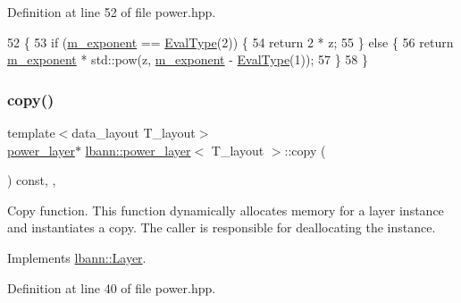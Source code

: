 Definition at line 52 of file power.\+hpp.


\begin{DoxyCode}
52                                                             \{
53     \textcolor{keywordflow}{if} (\hyperlink{classlbann_1_1power__layer_a778b995d25e24f5c82ab85cfeab2ee41}{m\_exponent} == \hyperlink{base_8hpp_a3266f5ac18504bbadea983c109566867}{EvalType}(2)) \{
54       \textcolor{keywordflow}{return} 2 * z;
55     \} \textcolor{keywordflow}{else} \{
56       \textcolor{keywordflow}{return} \hyperlink{classlbann_1_1power__layer_a778b995d25e24f5c82ab85cfeab2ee41}{m\_exponent} * std::pow(z, \hyperlink{classlbann_1_1power__layer_a778b995d25e24f5c82ab85cfeab2ee41}{m\_exponent} - \hyperlink{base_8hpp_a3266f5ac18504bbadea983c109566867}{EvalType}(1));
57     \}
58   \}
\end{DoxyCode}
\mbox{\label{classlbann_1_1power__layer_adb52a06aad68e2daee5ce2b738954bcb}} 
\subsubsection{\texorpdfstring{copy()}{copy()}}
{\footnotesize\ttfamily template$<$data\+\_\+layout T\+\_\+layout$>$ \\
\hyperlink{classlbann_1_1power__layer}{power\+\_\+layer}$\ast$ \hyperlink{classlbann_1_1power__layer}{lbann\+::power\+\_\+layer}$<$ T\+\_\+layout $>$\+::copy (\begin{DoxyParamCaption}{ }\end{DoxyParamCaption}) const\hspace{0.3cm}{\ttfamily [inline]}, {\ttfamily [override]}, {\ttfamily [virtual]}}

Copy function. This function dynamically allocates memory for a layer instance and instantiates a copy. The caller is responsible for deallocating the instance. 

Implements \hyperlink{classlbann_1_1Layer_af420f22bbac801c85483ade84588a23f}{lbann\+::\+Layer}.



Definition at line 40 of file power.\+hpp.


